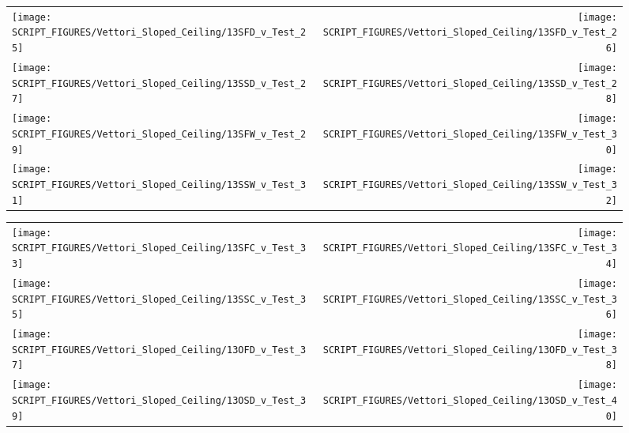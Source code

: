 \begin{figure}[p]
\begin{tabular*}{\textwidth}{l@{\extracolsep{\fill}}r}
\texttt{[image: SCRIPT\_FIGURES/Vettori\_Sloped\_Ceiling/13SFD\_v\_Test\_25]} &
\texttt{[image: SCRIPT\_FIGURES/Vettori\_Sloped\_Ceiling/13SFD\_v\_Test\_26]} \\
\texttt{[image: SCRIPT\_FIGURES/Vettori\_Sloped\_Ceiling/13SSD\_v\_Test\_27]} &
\texttt{[image: SCRIPT\_FIGURES/Vettori\_Sloped\_Ceiling/13SSD\_v\_Test\_28]} \\
\texttt{[image: SCRIPT\_FIGURES/Vettori\_Sloped\_Ceiling/13SFW\_v\_Test\_29]} &
\texttt{[image: SCRIPT\_FIGURES/Vettori\_Sloped\_Ceiling/13SFW\_v\_Test\_30]} \\
\texttt{[image: SCRIPT\_FIGURES/Vettori\_Sloped\_Ceiling/13SSW\_v\_Test\_31]} &
\texttt{[image: SCRIPT\_FIGURES/Vettori\_Sloped\_Ceiling/13SSW\_v\_Test\_32]} \\
\end{tabular*}
\label{Vettori_Sloped_4}
\end{figure}

\begin{figure}[p]
\begin{tabular*}{\textwidth}{l@{\extracolsep{\fill}}r}
\texttt{[image: SCRIPT\_FIGURES/Vettori\_Sloped\_Ceiling/13SFC\_v\_Test\_33]} &
\texttt{[image: SCRIPT\_FIGURES/Vettori\_Sloped\_Ceiling/13SFC\_v\_Test\_34]} \\
\texttt{[image: SCRIPT\_FIGURES/Vettori\_Sloped\_Ceiling/13SSC\_v\_Test\_35]} &
\texttt{[image: SCRIPT\_FIGURES/Vettori\_Sloped\_Ceiling/13SSC\_v\_Test\_36]} \\
\texttt{[image: SCRIPT\_FIGURES/Vettori\_Sloped\_Ceiling/13OFD\_v\_Test\_37]} &
\texttt{[image: SCRIPT\_FIGURES/Vettori\_Sloped\_Ceiling/13OFD\_v\_Test\_38]} \\
\texttt{[image: SCRIPT\_FIGURES/Vettori\_Sloped\_Ceiling/13OSD\_v\_Test\_39]} &
\texttt{[image: SCRIPT\_FIGURES/Vettori\_Sloped\_Ceiling/13OSD\_v\_Test\_40]} \\
\end{tabular*}
\label{Vettori_Sloped_5}
\end{figure}

